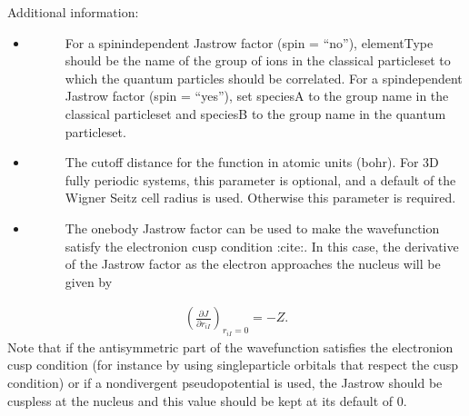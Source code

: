 \documentclass[letterpaper,10pt,english]{sphinxmanual}
\begin{document}
Additional information:
\begin{itemize}
\item {} \begin{description}
\item[{}] \leavevmode
For a spin\sphinxhyphen{}independent Jastrow factor (spin = “no”), elementType
should be the name of the group of ions in the classical particleset to
which the quantum particles should be correlated. For a spin\sphinxhyphen{}dependent
Jastrow factor (spin = “yes”), set speciesA to the group name in the
classical particleset and speciesB to the group name in the quantum
particleset.

\end{description}

\item {} \begin{description}
\item[{}] \leavevmode
The cutoff distance for the function in atomic units (bohr). For 3D
fully periodic systems, this parameter is optional, and a default of the
Wigner Seitz cell radius is used. Otherwise this parameter is required.

\end{description}

\item {} \begin{description}
\item[{}] \leavevmode
The one\sphinxhyphen{}body Jastrow factor can be used to make the wavefunction
satisfy the electron\sphinxhyphen{}ion cusp condition :cite:. In this
case, the derivative of the Jastrow factor as the electron approaches
the nucleus will be given by

\end{description}

\end{itemize}
\begin{equation}\label{equation:intro_wavefunction:eq10}
\begin{split}\left(\frac{\partial J}{\partial r_{iI}}\right)_{r_{iI} = 0} = -Z .\end{split}
\end{equation}
Note that if the antisymmetric part of the wavefunction satisfies the electron\sphinxhyphen{}ion cusp
condition (for instance by using single\sphinxhyphen{}particle orbitals that respect the cusp condition)
or if a nondivergent pseudopotential is used, the Jastrow should be cuspless at the
nucleus and this value should be kept at its default of 0.
\end{document}
